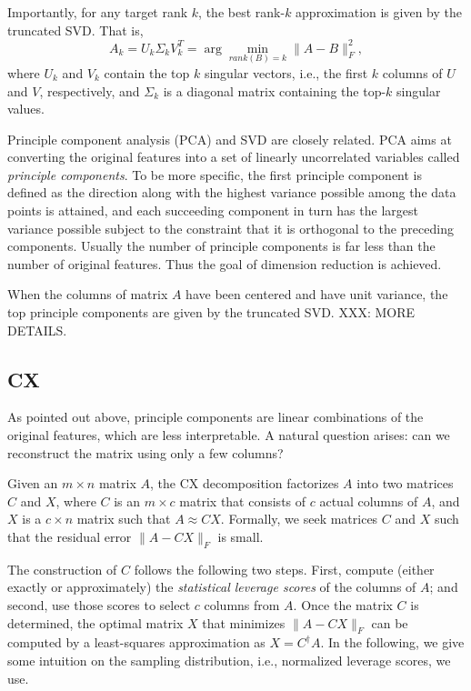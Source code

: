
Importantly, for any target rank $k$, the best rank-$k$ approximation is given by the truncated SVD. That is,
  \begin{equation}
     A_k = U_k \Sigma_k V_k^T = \arg\min_{rank(B) = k} \|A - B\|_F^2,
  \end{equation}
where $U_k$ and $V_k$ contain the top $k$ singular vectors, i.e., the first $k$ columns of $U$ and $V$, respectively, and $\Sigma_k$ is a diagonal matrix containing the top-$k$ singular values.

Principle component analysis (PCA) and SVD are closely related.
PCA aims at converting the original features into a set of linearly uncorrelated variables called {\it principle components}.
To be more specific, the first principle component is defined as the direction along with the highest variance possible among the data points is attained, and each succeeding component in turn has the largest variance possible subject to the constraint that it is orthogonal to the preceding components.
Usually the number of principle components is far less than the number of original features. Thus the goal of dimension reduction is achieved.

When the columns of matrix $A$ have been centered and have unit variance, the top principle components are given by the truncated SVD.
XXX: MORE DETAILS.

\subsection{CX}
As pointed out above, principle components are linear combinations of the original features, which are less interpretable. A natural question arises: can we reconstruct the matrix using only a few columns?

Given an $m \times n$ matrix $A$, the CX decomposition factorizes $A$ into two matrices $C$ and $X$, where $C$ is an $m\times c$ matrix that consists of $c$ actual columns
of $A$, and $X$ is a $c \times n$ matrix such that $A\approx CX$.
Formally, we seek matrices $C$ and $X$ such that the residual error $\|A-CX\|_F$ is small.

The construction of $C$ follows the following two steps. First, compute (either exactly or approximately) the {\it statistical leverage scores} of the columns of $A$;
and second, use those scores to select $c$ columns from $A$.
Once the matrix $C$ is determined, the optimal matrix $X$ that minimizes $\|A-CX\|_F$ can be computed by a least-squares approximation as $X=C^\dagger A$.
In the following, we give some intuition on the sampling distribution, i.e., normalized leverage scores, we use.

